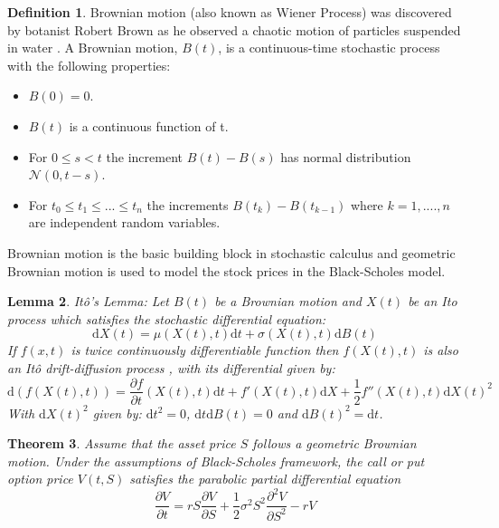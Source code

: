 \documentclass[12pt, oneside]{book}
\theoremstyle{plain}
\newtheorem{theorem}{Theorem}[section]
\newtheorem{lemma}[theorem]{Lemma}
\theoremstyle{definition}
\newtheorem{definition}[theorem]{Definition}
\begin{document}
\begin{definition} Brownian motion (also known as Wiener Process) was discovered by botanist Robert Brown as he observed a chaotic motion of particles suspended in water \cite{BM}. A Brownian motion, $B(t)$, is a  continuous-time stochastic process with the following properties: 
\begin{itemize}
\item $ B(0) = 0 $.
\item $ B(t) $ is a continuous function of t.
\item For $ 0  \leq s < t $ the increment $ B(t) -  B(s)  $ has normal distribution  $ \mathcal{N}(0, t-s) $.
\item  For $ t_0  \leq  t_1 \leq ... \leq  t_n $ the increments $ B(t_k) - B(t_{k-1}) $ where $k=1, .... ,n $ are independent random variables.
\end{itemize}    
Brownian motion is the basic building block in stochastic calculus and geometric Brownian motion is used to model the stock prices in the Black-Scholes model.\end{definition}

\begin{lemma} It\^{o}'s Lemma:
Let $B(t)$ be a Brownian motion and $X(t)$ be an Ito process which satisfies the stochastic differential equation:
\begin{equation}
\mathrm{d} X(t) = \mu(X(t),t)\mathrm{d} t + \sigma(X(t),t) \mathrm{d} B(t)
\end{equation} 
If $f(x, t)$ is twice continuously differentiable function then $f(X(t),t)$ is also an It\^{o} drift-diffusion process \cite{klebaner}, with its differential given by:
\begin{equation}
\mathrm{d}(f(X(t),t)) = \frac{\partial f}{\partial t}(X(t),t)\mathrm{d}t + f'(X(t),t)\mathrm{d}X + \frac{1}{2}f''(X(t),t)\mathrm{d} X(t)^2
\end{equation} 
With $ \mathrm{d} X(t)^2$ given by: $ \mathrm{d}t^2 = 0$, $\mathrm{d}t \mathrm{d}B(t) = 0$ and $\mathrm{d}B(t)^2 = \mathrm{d}t$.
\end{lemma}

\begin{theorem}
Assume that the asset price $S$ follows a geometric Brownian motion.  Under the assumptions of Black-Scholes framework, the call or put option price $V(t,S)$ satisfies the parabolic partial differential equation
\begin{equation}
\frac{\partial V}{\partial t} = rS\frac{\partial V}{\partial S}+\frac{1}{2} \sigma^2 S^2 \frac{\partial^2 V}{\partial S^2} - rV
\end{equation}
\end{theorem}
\end{document}
